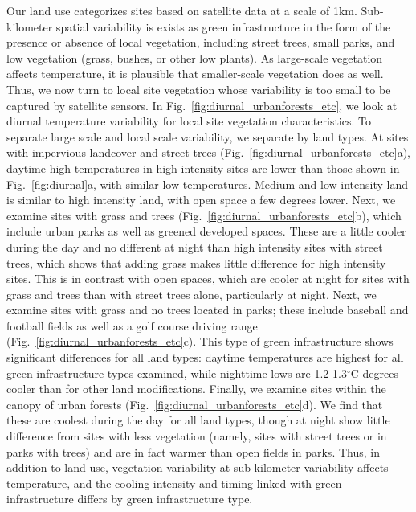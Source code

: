 \documentclass[draft,linenumbers]{agujournal}
\begin{document}
Our land use categorizes sites based on satellite data at a scale of 1km.  Sub-kilometer spatial variability is exists as green infrastructure in the form of the presence or absence of local vegetation, including street trees, small parks, and low vegetation (grass, bushes, or other low plants). As large-scale vegetation affects temperature, it is plausible that smaller-scale vegetation does as well. 
Thus, we now turn to local site vegetation whose variability is too small to be captured by satellite sensors. 
In Fig.~\ref{fig:diurnal_urbanforests_etc}, we look at diurnal temperature variability for local site vegetation characteristics. To separate large scale and local scale variability, we separate by land types. At sites with impervious landcover and street trees (Fig.~\ref{fig:diurnal_urbanforests_etc}a), daytime high temperatures in high intensity sites are lower than those shown in Fig.~\ref{fig:diurnal}a, with similar low temperatures. Medium and low intensity land is similar to high intensity land, with open space a few degrees lower. Next, we examine sites with grass and trees (Fig.~\ref{fig:diurnal_urbanforests_etc}b), which include urban parks as well as greened developed spaces. These are a little cooler during the day and no different at night than high intensity sites with street trees, which shows that adding grass makes little difference for high intensity sites. This is in contrast with open spaces, which are cooler at night for sites with grass and trees than with street trees alone, particularly at night. Next, we examine sites with grass and no trees located in parks; these include baseball and football fields as well as a golf course driving range (Fig.~\ref{fig:diurnal_urbanforests_etc}c). This type of green infrastructure shows significant differences for all land types: daytime temperatures are highest for all green infrastructure types examined, while nighttime lows are 1.2-1.3$^\circ$C degrees cooler than for other land modifications. 
Finally, we examine sites within the canopy of urban forests (Fig.~\ref{fig:diurnal_urbanforests_etc}d). 
We find that these are coolest during the day for all land types, though at night show little difference from sites with less vegetation (namely, sites with street trees or in parks with trees) and are in fact warmer than open fields in parks. 
Thus, in addition to land use, vegetation variability at sub-kilometer variability affects temperature, and the cooling intensity and timing linked with green infrastructure differs by green infrastructure type. 
\end{document}
